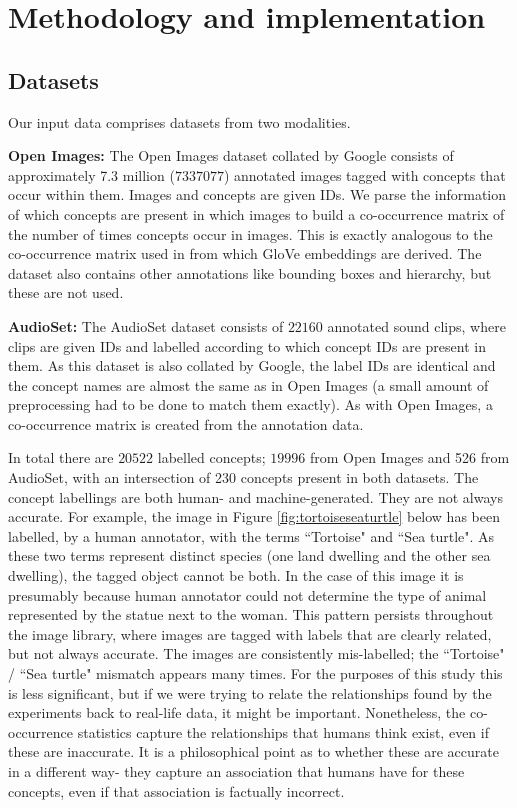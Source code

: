 
\chapter{Methodology and implementation}

\section{Datasets}

Our input data comprises datasets from two modalities. 

\textbf{Open Images:} The Open Images dataset \cite{openimages} collated by Google consists of approximately 7.3 million ($7337077$) annotated images tagged with concepts that occur within them. Images and concepts are given IDs. We parse the information of which concepts are present in which images to build a co-occurrence matrix of the number of times concepts occur in images. This is exactly analogous to the co-occurrence matrix used in \cite{pennington2014glove} from which GloVe embeddings are derived. The dataset also contains other annotations like bounding boxes and hierarchy, but these are not used.

\textbf{AudioSet:} The AudioSet dataset \cite{audioset} consists of $22160$ annotated sound clips, where clips are given IDs and labelled according to which concept IDs are present in them. As this dataset is also collated by Google, the label IDs are identical and the concept names are almost the same as in Open Images (a small amount of preprocessing had to be done to match them exactly). As with Open Images, a co-occurrence matrix is created from the annotation data. 

In total there are $20522$ labelled concepts; $19996$ from Open Images and 526 from AudioSet, with an intersection of 230 concepts present in both datasets. 
The concept labellings are both human- and machine-generated. They are not always accurate. For example, the image in Figure \ref{fig:tortoiseseaturtle} below has been labelled, by a human annotator, with the terms ``Tortoise" and ``Sea turtle". As these two terms represent distinct species (one land dwelling and the other sea dwelling), the tagged object cannot be both. In the case of this image it is presumably because human annotator could not determine the type of animal represented by the statue next to the woman. This pattern persists throughout the image library, where images are tagged with labels that are clearly related, but not always accurate. The images are consistently mis-labelled; the ``Tortoise" / ``Sea turtle" mismatch appears many times. For the purposes of this study this is less significant, but if we were trying to relate the relationships found by the experiments back to real-life data, it might be important. Nonetheless, the co-occurrence statistics capture the relationships that humans think exist, even if these are inaccurate. It is a philosophical point as to whether these are accurate in a different way- they capture an association that humans have for these concepts, even if that association is factually incorrect. 

